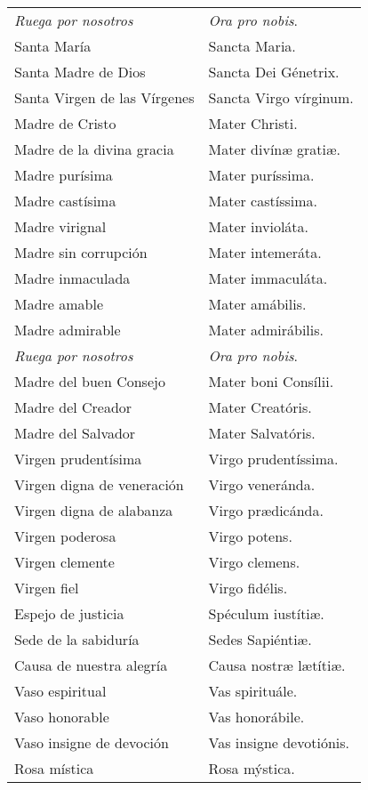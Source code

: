 \documentclass[./rosary.tex]{subfiles}
\begin{document}
\begin{longtable} { p{} p{} }
    \emph{\color{red}Ruega por nosotros} & \emph{\color{red}Ora pro nobis}.\\
    Santa María & Sancta Maria.\\
    Santa Madre de Dios & Sancta Dei Génetrix.\\
    Santa Virgen de las Vírgenes & Sancta Virgo vírginum.\\
    Madre de Cristo & Mater Christi.\\
    Madre de la divina gracia & Mater divínæ gratiæ.\\
    Madre purísima & Mater puríssima.\\
    Madre castísima & Mater castíssima.\\
    Madre virignal & Mater invioláta.\\
    Madre sin corrupción & Mater intemeráta.\\
    Madre inmaculada & Mater immaculáta.\\
    Madre amable & Mater amábilis.\\
    Madre admirable & Mater admirábilis.\\
    \emph{\color{red}Ruega por nosotros} & \emph{\color{red}Ora pro nobis}.\\    
    Madre del buen Consejo & Mater boni Consílii.\\
    Madre del Creador & Mater Creatóris.\\
    Madre del Salvador & Mater Salvatóris.\\
    Virgen prudentísima & Virgo pru­den­tíssima.\\
    Virgen digna de veneración & Virgo veneránda.\\
    Virgen digna de alabanza & Virgo prædicánda.\\
    Virgen poderosa & Virgo potens.\\
    Virgen clemente & Virgo clemens.\\
    Virgen fiel & Virgo fidélis.\\
    Espejo de justicia & Spéculum iustítiæ.\\
    Sede de la sabiduría & Sedes Sapiéntiæ.\\
    Causa de nuestra alegría & Causa nostræ lætítiæ.\\
    Vaso espiritual & Vas spirituále.\\
    Vaso honorable & Vas honorábile.\\
    Vaso insigne de devoción & Vas insigne devotiónis.\\
    Rosa mística & Rosa mýstica.\\

\end{longtable}
\end{document}
